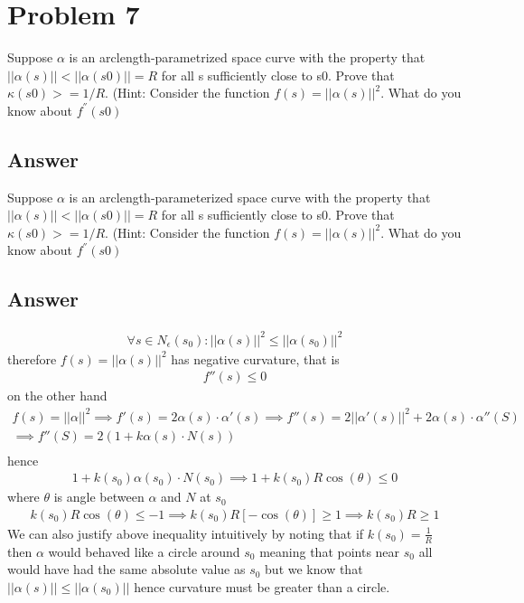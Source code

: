 \documentclass[
	12pt, %
]{fphw}
\theoremstyle{plain}
\begin{document}
\section*{Problem 7}
\begin{problem}
     Suppose \(\alpha\) is an arclength-parametrized space curve with the property that $||\alpha(s)||<||\alpha(s0)|| = R$ for
all s sufficiently close to s0. Prove that \(\kappa(s0) >= 1/R\). (Hint: Consider the function $f (s) = ||\alpha(s)||^{2}$.
What do you know about \(f^{''} (s0)\)
\end{problem}
\subsection*{Answer}
Suppose \(\alpha\) is an arclength-parameterized space curve with the property that $||\alpha(s)||<||\alpha(s0)|| = R$ for
all s sufficiently close to s0. Prove that \(\kappa(s0) >= 1/R\). (Hint: Consider the function $f (s) = ||\alpha(s)||^{2}$.
What do you know about \(f^{''} (s0)\)
\subsection*{Answer}

\begin{align*}
    \forall s \in N_\epsilon(s_0) : ||\alpha(s)||^2 \leq ||\alpha(s_0)||^2
\end{align*}
    therefore  $f(s)=||\alpha(s)||^2$  has negative curvature, that is
\begin{align*}
    f''(s) \leq 0
\end{align*}
on the other hand
\begin{align*}
     f(s) = ||\alpha||^2 \implies f'(s)=2\alpha(s)\cdot \alpha'(s) \implies 
     f''(s)=2||\alpha'(s)||^2 + 2\alpha(s)\cdot \alpha''(S) \\
     \implies f''(S)=2\left( 1+k\alpha(s)\cdot N(s)\right)\\
\end{align*}
     hence
\begin{align*}
     1+k(s_0)\alpha(s_0)\cdot N(s_0) \implies 1+k(s_0)R\cos(\theta) \leq 0
\end{align*}
    where $\theta$ is angle between $\alpha$ and $N$ at $s_0$
\begin{align*}
     k(s_0)R\cos(\theta)\leq -1 \implies k(s_0)R\left[-\cos(\theta)\right] \geq 1 \implies k(s_0)R \geq 1
\end{align*}
We can also justify above inequality intuitively by noting that if $k(s_0) = \frac{1}{R}$ \\
then $\alpha$ would behaved like a circle around $s_0$ meaning that points near $s_0$ all would have had the same absolute value as $s_0$ but we know that $||\alpha(s)|| \leq ||\alpha(s_0)||$ hence curvature must be greater than a circle.
\end{document}
